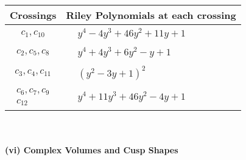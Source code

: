 \documentclass[1p]{elsarticle_modified}
\theoremstyle{definition}
\begin{document}
\begin{tabular}{m{50pt}|m{274pt}}
Crossings & \hspace{64pt}Riley Polynomials at each crossing \\
\hline $$\begin{aligned}c_{1},c_{10}\end{aligned}$$&$\begin{aligned}
&y^4-4 y^3+46 y^2+11 y+1
\end{aligned}$\\
\hline $$\begin{aligned}c_{2},c_{5},c_{8}\end{aligned}$$&$\begin{aligned}
&y^4+4 y^3+6 y^2- y+1
\end{aligned}$\\
\hline $$\begin{aligned}c_{3},c_{4},c_{11}\end{aligned}$$&$\begin{aligned}
&(y^2-3 y+1)^2
\end{aligned}$\\
\hline $$\begin{aligned}c_{6},c_{7},c_{9}\\c_{12}\end{aligned}$$&$\begin{aligned}
&y^4+11 y^3+46 y^2-4 y+1
\end{aligned}$\\
\hline
\end{tabular}\\~\\
\newpage\flushleft \textbf{(vi) Complex Volumes and Cusp Shapes}
\end{document}

